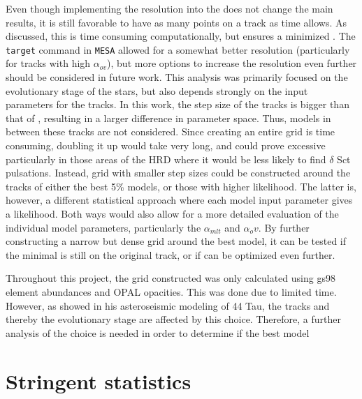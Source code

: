 Even though implementing the resolution into the \chis does not change the main results, it is still favorable to have as many points on a track as time allows. As discussed, this is time consuming computationally, but ensures a minimized \chis. The \texttt{target} command in \texttt{MESA} allowed for a somewhat better resolution (particularly for tracks with high $\alpha_{ov}$), but more options to increase the resolution even further should be considered in future work. This analysis was primarily focused on the evolutionary stage of the stars, but also depends strongly on the input parameters for the tracks. In this work, the step size of the tracks is bigger than that of \citet{lenz2010delta}, resulting in a larger difference in parameter space. Thus, models in between these tracks are not considered. Since creating an entire grid is time consuming, doubling it up would take very long, and could prove excessive particularly in those areas of the HRD where it would be less likely to find $\delta$ Sct pulsations. Instead, grid with smaller step sizes could be constructed around the tracks of either the best 5\% models, or those with higher likelihood. The latter is, however, a different statistical approach where each model input parameter gives a likelihood. Both ways would also allow for a more detailed evaluation of the individual model parameters, particularly the $\alpha_{mlt}$ and $\alpha_ov$. By further constructing a narrow but dense grid around the best model, it can be tested if the minimal \chis is still on the original track, or if \chis can be optimized even further.  


Throughout this project, the grid constructed was only calculated using gs98 element abundances and OPAL opacities. This was done due to limited time. However, as \citet{lenz2010delta} showed in his asteroseismic modeling of 44 Tau,  the tracks and thereby the evolutionary stage are affected by this choice. Therefore, a further analysis of the choice is needed in order to determine if the best model \chis 


\section{Stringent statistics}

